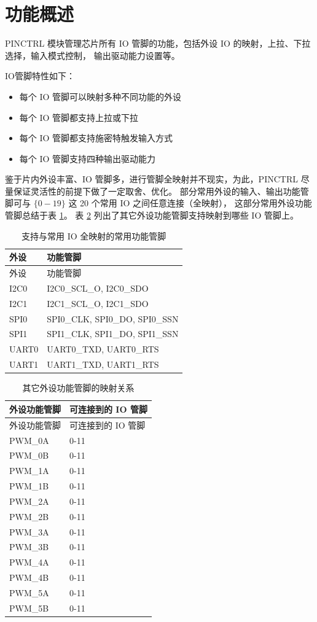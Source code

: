 \documentclass[
  12pt,
]{book}
\providecommand{\tightlist}{%
  \setlength{\itemsep}{0pt}\setlength{\parskip}{0pt}}
\begin{document}
\hypertarget{ux529fux80fdux6982ux8ff0-1}{%
\section{功能概述}\label{ux529fux80fdux6982ux8ff0-1}}

PINCTRL 模块管理芯片所有 IO 管脚的功能，包括外设 IO 的映射，上拉、下拉选择，输入模式控制，
输出驱动能力设置等。

IO管脚特性如下：

\begin{itemize}
\tightlist
\item
  每个 IO 管脚可以映射多种不同功能的外设
\item
  每个 IO 管脚都支持上拉或下拉
\item
  每个 IO 管脚都支持施密特触发输入方式
\item
  每个 IO 管脚支持四种输出驱动能力
\end{itemize}

鉴于片内外设丰富、IO 管脚多，进行管脚全映射并不现实，为此，PINCTRL 尽量保证灵活性的前提下做了一定取舍、优化。
部分常用外设的输入、输出功能管脚可与 \(\{{0-19\}}\) 这 20 个常用 IO 之间任意连接（全映射），
这部分常用外设功能管脚总结于表 \ref{tab:ch-pinctrl-common-set}。
表 \ref{tab:ch-pinctrl-mapping} 列出了其它外设功能管脚支持映射到哪些 IO 管脚上。

\begin{longtable}[]{@{}ll@{}}
\caption{\label{tab:ch-pinctrl-common-set} 支持与常用 IO 全映射的常用功能管脚}\tabularnewline
\toprule
外设 & 功能管脚\tabularnewline
\midrule
\endfirsthead
\toprule
外设 & 功能管脚\tabularnewline
\midrule
\endhead
I2C0 & I2C0\_SCL\_O, I2C0\_SDO\tabularnewline
I2C1 & I2C1\_SCL\_O, I2C1\_SDO\tabularnewline
SPI0 & SPI0\_CLK, SPI0\_DO, SPI0\_SSN\tabularnewline
SPI1 & SPI1\_CLK, SPI1\_DO, SPI1\_SSN\tabularnewline
UART0 & UART0\_TXD, UART0\_RTS\tabularnewline
UART1 & UART1\_TXD, UART1\_RTS\tabularnewline
\bottomrule
\end{longtable}

\begin{longtable}[]{@{}ll@{}}
\caption{\label{tab:ch-pinctrl-mapping} 其它外设功能管脚的映射关系}\tabularnewline
\toprule
外设功能管脚 & 可连接到的 IO 管脚\tabularnewline
\midrule
\endfirsthead
\toprule
外设功能管脚 & 可连接到的 IO 管脚\tabularnewline
\midrule
\endhead
PWM\_0A & 0-11\tabularnewline
PWM\_0B & 0-11\tabularnewline
PWM\_1A & 0-11\tabularnewline
PWM\_1B & 0-11\tabularnewline
PWM\_2A & 0-11\tabularnewline
PWM\_2B & 0-11\tabularnewline
PWM\_3A & 0-11\tabularnewline
PWM\_3B & 0-11\tabularnewline
PWM\_4A & 0-11\tabularnewline
PWM\_4B & 0-11\tabularnewline
PWM\_5A & 0-11\tabularnewline
PWM\_5B & 0-11\tabularnewline
\bottomrule
\end{longtable}
\end{document}

